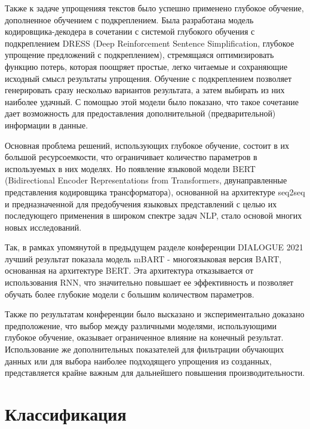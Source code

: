 Также к задаче упрощенияя текстов было успешно применено глубокое обучение, дополненное обучением с подкреплением\cite{zhang_sentence_2017}. Была разработана модель кодировщика-декодера в сочетании с системой глубокого обучения с подкреплением DRESS (Deep Reinforcement Sentence Simplification, глубокое упрощение предложений с подкреплением), стремящаяся оптимизировать функцию потерь, которая поощряет простые, легко читаемые и сохраняющие исходный смысл результаты упрощения. Обучение с подкреплением позволяет генерировать сразу несколько вариантов результата, а затем выбирать из них наиболее удачный. С помощью этой модели было показано, что такое сочетание дает возможность для предоставления дополнительной (предварительной) информации в данные.

Основная проблема решений, использующих глубокое обучение, состоит в их большой ресурсоемкости, что ограничивает количество параметров в используемых в них моделях. Но появление языковой модели BERT\cite{devlin_bert_2019} (Bidirectional Encoder Representations from Transformers, двунаправленные представления кодировщика трансформатора), основанной на архитектуре seq2seq и предназначенной для предобучения языковых представлений с целью их последующего применения в широком спектре задач NLP, стало основой многих новых исследований. 


Так, в рамках упомянутой в предыдущем разделе конференции DIALOGUE 2021 лучший результат показала модель mBART - многоязыковая версия BART, основанная на архитектуре BERT. Эта архитектура отказывается от использования RNN, что значительно повышает ее эффективность и позволяет обучать более глубокие модели с большим количеством параметров.

Также по результатам конференции было высказано и экспериментально доказано предположение, что выбор между различными моделями, использующими глубокое обучение, оказывает ограниченное влияние на конечный результат. Использование же дополнительных показателей для фильтрации обучающих данных или для выбора наиболее подходящего упрощения из созданных, представляется крайне важным для дальнейшего повышения производительности. 

\section{Классификация}

